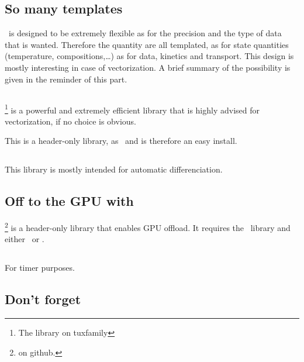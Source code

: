 \subsection{So many templates}
\Antioch\ is designed to be extremely flexible as for
the precision and the type of data that is wanted. Therefore
the quantity are all templated, as for state quantities (temperature,
compositions,\dots) as for data, kinetics and transport. This design
is mostly interesting in case of vectorization. A brief summary of the
possibility is given in the reminder of this part.

\subsection{\EIGEN}
\EIGEN\footnote{The \href{eigen.tuxfamily.org}{\EIGEN} library on tuxfamily}
is a powerful and extremely efficient library that is highly advised for
vectorization, if no choice is obvious.

This is a header-only library, as \Antioch\ and is therefore an easy install.

\subsection{\MetaPhysicL}

This library is mostly intended for automatic differenciation.

\subsection{Off to the GPU with \VexCL}
\VexCL\footnote{\href{https://github.com/ddemidov/vexcl}{\VexCL} on github.}
is a header-only library that enables GPU offload. It requires the \Boost\
library and either \ViennaCL\ or \openCL.

\subsection{\GRVY}

For timer purposes.

\subsection{Don't forget \Doxygen}
\label{dox}


